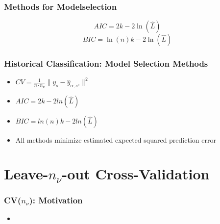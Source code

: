 \documentclass[20pt]{beamer}
\begin{document}
\begin{frame}
\frametitle{Methods for Modelselection}
\[
AIC = 2k - 2\ln(\hat{L})
\]
\vspace*{0.5cm}
\[
BIC = \ln(n)k - 2\ln(\hat{L})
\]
\end{frame}

\begin{frame}
	\frametitle{Historical Classification: Model Selection Methods}
	\begin{itemize}
		\item $CV=\frac{1}{n\cdot n_\nu}\parallel y_s-\hat{y}_{\alpha,s^c}\parallel^2$
		\item $AIC=2k-2ln(\hat{L})$
		\item $BIC=ln(n)k-2ln(\hat{L})$
		\item All methods minimize estimated expected squared prediction error
	\end{itemize}
\end{frame}

\section{Leave-$n_\nu$-out Cross-Validation}

\begin{frame}
	\frametitle{CV($n_\nu$): Motivation}
	\begin{itemize}
		\item
	\end{itemize}
\end{frame}
\end{document}
